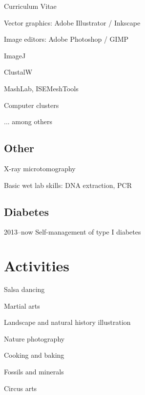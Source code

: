 \documentclass[11pt,a4paper]{article}
\begin{document}
\begin{cv}{Curriculum Vitae}
\begin{cvlist}{}
			\item Vector graphics: Adobe Illustrator / Inkscape
			\item Image editors: Adobe Photoshop / GIMP
			\item ImageJ
			\item ClustalW
			\item MashLab, ISEMeshTools
			\item Computer clusters
			\item ... among others
			
		\end{cvlist}
		
		\subsection{Other}
		
		\begin{cvlist}{}
			
			\item X-ray microtomography
			\item Basic wet lab skills: DNA extraction, PCR
			
		\end{cvlist}
	
		\subsection{Diabetes}
		
		\begin{cvlist}{}
			
			\item[2013--now] Self-management of type I diabetes
			
		\end{cvlist}
	
		\section{Activities}
		
		\begin{cvlist}{}
			
			\item Salsa dancing
			
			\item Martial arts
			
			\item Landscape and natural history illustration
			
			\item Nature photography
			
			\item Cooking and baking
			
			\item Fossils and minerals
			
			\item Circus arts
			
		\end{cvlist}
	
		
		\vfill
		\date{}
		
	\end{cv}
	
\end{document}
